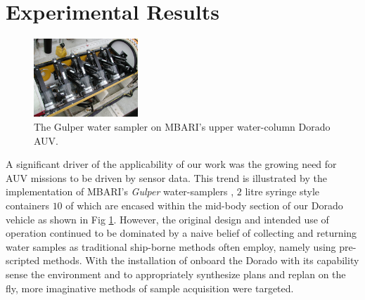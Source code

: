 \section{Experimental Results}
\label{sec:results}



\begin{figure}[htpb]
\centering
\includegraphics[width=0.35\textwidth]{figs/gulper.jpg}
\caption{\small{The Gulper water sampler \cite{Bird07} on MBARI's
    upper water-column Dorado AUV.}}
\label{fig:gulper}
\end{figure}

A significant driver of the applicability of our work was the growing
need for AUV missions to be driven by sensor data. This trend is
illustrated by the implementation of MBARI's \emph{Gulper}
water-samplers \cite{Bird07}, $2$ litre syringe style containers $10$
of which are encased within the mid-body section of our Dorado vehicle
as shown in Fig \ref{fig:gulper}. However, the original design and
intended use of operation continued to be dominated by a naive belief
of collecting and returning water samples as traditional ship-borne
methods often employ, namely using pre-scripted methods. With the
installation of \rx onboard the Dorado with its capability sense the
environment and to appropriately synthesize plans and replan on the
fly, more imaginative methods of sample acquisition were targeted.


